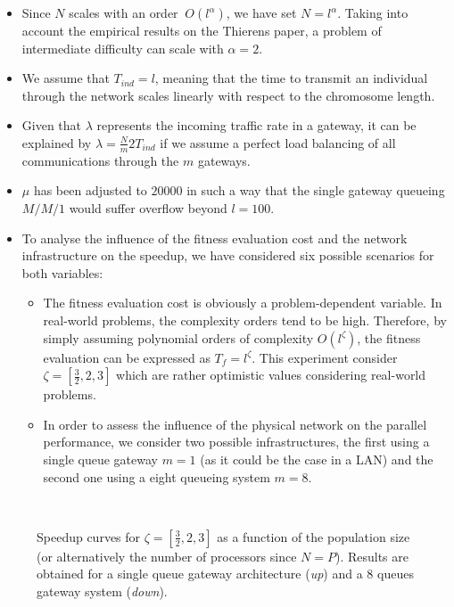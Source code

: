 \begin{itemize} 
\item Since $N$ scales with an order $~O(l^\alpha)$, we have set $N=l^\alpha$. Taking into account the empirical results on the Thierens paper, a problem of intermediate difficulty can scale with $\alpha=2$. 

\item We assume that $T_{ind}=l$, meaning that the time to transmit an individual through the network scales linearly with respect to the chromosome length.

\item Given that $\lambda$ represents the incoming traffic rate in a gateway, it can be explained by $\lambda=\frac{N}{m}2T_{ind}$ if we assume a perfect load balancing of all communications through the $m$ gateways.

\item $\mu$ has been adjusted to $20000$ in such a way that the single gateway queueing $M/M/1$ would suffer overflow beyond $l=100$.

\item To analyse the influence of the fitness evaluation cost and the network infrastructure on the speedup, we have considered six possible scenarios for both variables:

\begin{itemize}
\item The fitness evaluation cost is obviously a problem-dependent variable. In real-world problems, the complexity orders tend to be high. Therefore, by simply assuming polynomial orders of complexity $O(l^\zeta)$, the fitness evaluation can be expressed as $T_f=l^\zeta$. This experiment consider $\zeta=[\frac{3}{2},2,3]$  which are rather optimistic values considering real-world problems.

\item In order to assess the influence of the physical network on the parallel performance, we consider two possible infrastructures, the first using a single queue gateway $m=1$ (as it could be the case in a LAN) and the second one using a eight queueing system $m=8$.
\end{itemize}

\end{itemize}


\begin{figure*}[htbp]
\centering
\subfigure{\texttt{[image: mm1]}}\\
\subfigure{\texttt{[image: mm8]}}
\caption{ Speedup curves for $\zeta=[\frac{3}{2},2,3]$ as a function of the population size (or alternatively the number of processors since $N=P$). Results are obtained for a single queue gateway architecture ({\em up}) and a 8 queues gateway system ({\em down}).}
\label{fig:parallelperformance}
\end{figure*}

